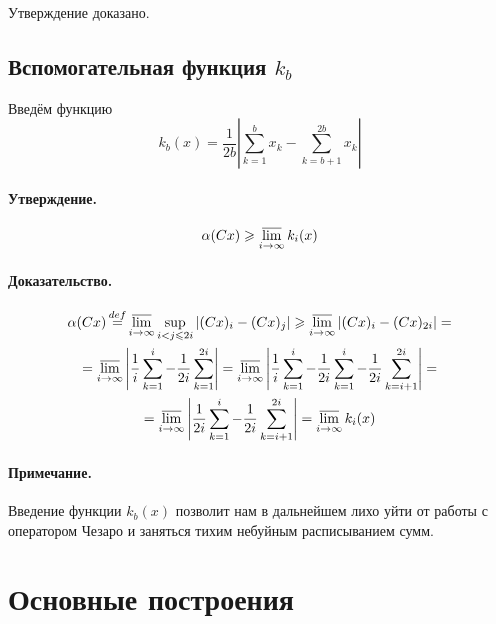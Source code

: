 Утверждение доказано.

\subsection{Вспомогательная функция $k_b$}

Введём функцию
\begin{equation}\label{def_k_b}
	k_b(x) = \frac{1}{2b}\left|
		\sum_{k=1}^{b}x_k - \sum_{k=b+1}^{2b}x_k
	\right|
\end{equation}

\paragraph{Утверждение.}
\begin{equation}\label{alpha_greater_k_b}
	\alpha (Cx) \geq \varlimsup_{i\to \infty} k_i(x)
\end{equation}

\paragraph{Доказательство.}

\begin{multline*}
	\alpha (Cx) \mathop{=}\limits^{def}
	\varlimsup_{i\to \infty} \sup_{i<j\leq 2i} |(Cx)_i - (Cx)_j| \geq
	\varlimsup_{i\to \infty} |(Cx)_i - (Cx)_{2i}| =
	\\ =
	\varlimsup_{i\to \infty} \left|\frac{1}{i}\sum_{k=1}^i  - \frac{1}{2i}\sum_{k=1}^{2i} \right| =
	\varlimsup_{i\to \infty} \left|\frac{1}{i}\sum_{k=1}^i  - \frac{1}{2i}\sum_{k=1}^{i}- \frac{1}{2i}\sum_{k=i+1}^{2i}\right| =
	\\=
	\varlimsup_{i\to \infty} \left|\frac{1}{2i}\sum_{k=1}^i - \frac{1}{2i}\sum_{k=i+1}^{2i}\right| =
	\varlimsup_{i\to \infty} k_i(x)
\end{multline*}

\paragraph{Примечание.}
Введение функции $k_b(x)$ позволит нам в дальнейшем лихо уйти от работы с оператором Чезаро
и заняться тихим небуйным расписыванием сумм.



\section{Основные построения}

